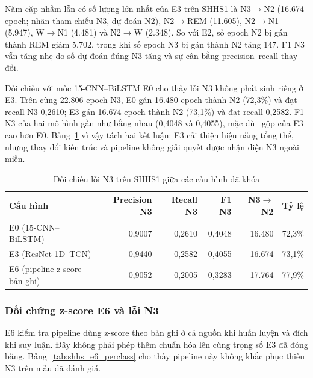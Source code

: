 Năm cặp nhầm lẫn có số lượng lớn nhất của E3 trên SHHS1 là N3$\rightarrow$N2 (16.674 epoch; nhãn tham chiếu N3, dự đoán N2), N2$\rightarrow$REM (11.605), N2$\rightarrow$N1 (5.947), W$\rightarrow$N1 (4.481) và N2$\rightarrow$W (2.348). So với E2, số epoch N2 bị gán thành REM giảm 5.702, trong khi số epoch N3 bị gán thành N2 tăng 147. F1 N3 vẫn tăng nhẹ do số dự đoán đúng N3 tăng và sự cân bằng precision--recall thay đổi.

Đối chiếu với mốc 15-CNN--BiLSTM E0 cho thấy lỗi N3 không phát sinh riêng ở E3. Trên cùng 22.806 epoch N3, E0 gán 16.480 epoch thành N2 (72,3\%) và đạt recall N3 0,2610; E3 gán 16.674 epoch thành N2 (73,1\%) và đạt recall 0,2582. F1 N3 của hai mô hình gần như bằng nhau (0,4048 và 0,4055), mặc dù \mf\ gộp của E3 cao hơn E0. Bảng~\ref{tab:shhs_n3_crossmodel} vì vậy tách hai kết luận: E3 cải thiện hiệu năng tổng thể, nhưng thay đổi kiến trúc và pipeline không giải quyết được nhận diện N3 ngoài miền.

\begin{table}[H]
\centering
\caption{Đối chiếu lỗi N3 trên SHHS1 giữa các cấu hình đã khóa}
\label{tab:shhs_n3_crossmodel}
\begin{tabular}{lrrrrr}
\toprule
\textbf{Cấu hình} & \textbf{Precision N3} & \textbf{Recall N3} & \textbf{F1 N3} & \textbf{N3$\rightarrow$N2} & \textbf{Tỷ lệ} \\
\midrule
E0 (15-CNN--BiLSTM) & 0,9007 & 0,2610 & 0,4048 & 16.480 & 72,3\% \\
E3 (ResNet-1D--TCN) & 0,9440 & 0,2582 & 0,4055 & 16.674 & 73,1\% \\
E6 (pipeline z-score bản ghi) & 0,9052 & 0,2005 & 0,3283 & 17.764 & 77,9\% \\
\bottomrule
\end{tabular}
\end{table}

\subsubsection{Đối chứng z-score E6 và lỗi N3}

E6 kiểm tra pipeline dùng z-score theo bản ghi ở cả nguồn khi huấn luyện và đích khi suy luận. Đây không phải phép thêm chuẩn hóa lên cùng trọng số E3 đã đóng băng. Bảng~\ref{tab:shhs_e6_perclass} cho thấy pipeline này không khắc phục thiếu N3 trên mẫu đã đánh giá.

